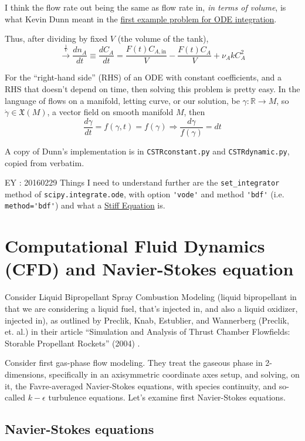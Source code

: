 \documentclass[10pt]{amsart}
\begin{document}
\begin{multicols*}{2}
I think the flow rate out being the same as flow rate in, \emph{in terms of volume}, is what Kevin Dunn meant in the \href{http://modelling3e4.connectmv.com/wiki/Software_tutorial/Integration_of_ODEs}{first example problem for ODE integration}.  

Thus, after dividing by fixed $V$ (the volume of the tank), 
\[
\xrightarrow{ \frac{1}{V} } \frac{dn_A}{dt} \equiv \frac{dC_A}{dt} = \frac{F(t)C_{A,\text{in}}}{V} - \frac{F(t)C_A}{V} + \nu_A k C_A^2 
\]

For the ``right-hand side'' (RHS) of an ODE with constant coefficients, and a RHS that doesn't depend on time, then solving this problem is pretty easy.  In the language of flows on a manifold, letting curve, or our solution, be $\gamma :\mathbb{R} \to M$, so $\dot{\gamma} \in \mathfrak{X}(M)$, a vector field on smooth manifold $M$, then
\[
\frac{d\gamma}{dt} = f(\gamma,t) = f(\gamma) \Longrightarrow \frac{d\gamma}{f(\gamma)} = dt
\]

A copy of Dunn's implementation is in \verb|CSTRconstant.py| and \verb|CSTRdynamic.py|, copied from verbatim.  

EY : 20160229 Things I need to understand further are the \verb|set_integrator| method of \verb|scipy.integrate.ode|, with option \verb|'vode'| and method \verb|'bdf'| (i.e. \verb|method='bdf'|) and what a \href{https://en.wikipedia.org/wiki/Stiff_equation}{Stiff Equation} is. 

\section{Computational Fluid Dynamics (CFD) and Navier-Stokes equation}

Consider Liquid Bipropellant Spray Combustion Modeling (liquid bipropellant in that we are considering a liquid fuel, that's injected in, and also a liquid oxidizer, injected in), as outlined by Preclik, Knab, Estublier, and Wannerberg (Preclik, et. al.) in their article ``Simulation and Analysis of Thrust Chamber Flowfields: Storable Propellant Rockets'' (2004) \cite{YHHP2004}.  

Consider first gas-phase flow modeling.  They treat the gaseous phase in 2-dimensions, specifically in an axisymmetric coordinate axes setup, and solving, on it, the Favre-averaged Navier-Stokes equations, with species continuity, and so-called $k-\epsilon$ turbulence equations.  Let's examine first Navier-Stokes equations.

\subsection{Navier-Stokes equations}


\end{multicols*}
\end{document}
